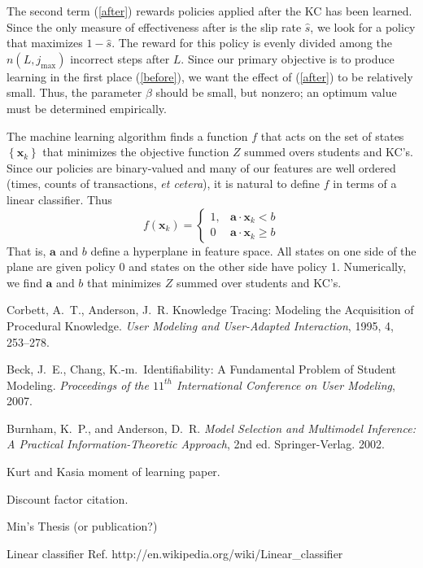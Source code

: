 \documentclass[11pt,letterpaper]{article}
\begin{document}
The second term (\ref{after}) rewards policies applied after
the KC has been learned.  Since the only measure of effectiveness
after is the slip rate $\hat{s}$, we look for a policy that maximizes
$1-\hat{s}$.  The reward for this policy is evenly divided
among the $n(L,j_\mathrm{max})$ incorrect steps after $L$.
Since our primary objective is to produce learning in the first
place (\ref{before}), we want the effect of (\ref{after}) to be 
relatively small.
Thus, the parameter $\beta$ should be small, but nonzero; an
optimum value must be determined empirically.

The machine learning algorithm finds a function $f$ that acts on
the set of states $\left\{\mathbf{x}_k\right\}$ that minimizes
the objective function $Z$ summed overs students and KC's.  
Since our policies are binary-valued
and many of our features are well ordered (times, counts of transactions,
{\em et cetera}), it is natural to define $f$ in terms of a 
linear classifier.  Thus
%
\begin{equation}
              f(\mathbf{x}_k) = \left\{\begin{array}{cc}
		1,& \mathbf{a}\cdot \mathbf{x}_k <b \\
                0 & \mathbf{a}\cdot \mathbf{x}_k \ge b
		\end{array} \right.
\end{equation}
%
That is, $\mathbf{a}$ and $b$ define a hyperplane in feature
space.  All states on one side of the plane are given policy 0
and states on the other side have policy 1.
Numerically, we find $\mathbf{a}$ and $b$ that minimizes $Z$
summed over students and KC's.



\begin{thebibliography}{9}

  Corbett, A.\ T., Anderson, J.\ R. Knowledge Tracing:  Modeling 
the Acquisition of Procedural Knowledge.  \emph{User Modeling and
 User-Adapted Interaction}, 1995, 4, 253--278.

  Beck, J.\ E., Chang, K.-m.\ Identifiability: A Fundamental Problem of
  Student Modeling.
  \emph{Proceedings of the $11^{th}$ International Conference on User 
    Modeling}, 2007.

Burnham, K.~P., and Anderson, D.~R. \emph{Model
  Selection and Multimodel Inference: A Practical
  Information-Theoretic Approach}, 2nd ed. Springer-Verlag. 2002.

Kurt and Kasia moment of learning paper.

Discount factor citation.

Min's Thesis (or publication?)

Linear classifier Ref. 
     http://en.wikipedia.org/wiki/Linear\_classifier

\end{thebibliography}
\end{document}

